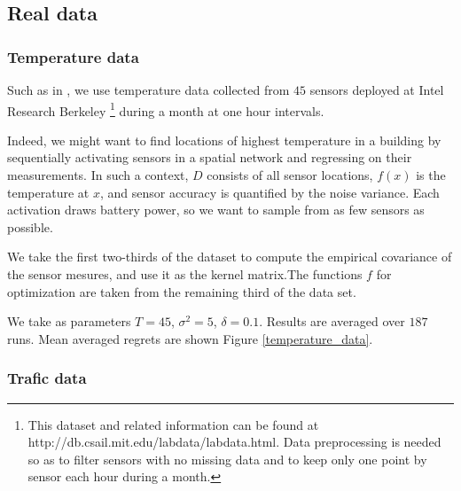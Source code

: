 \documentclass{article} %
\begin{document}
\subsection{Real data} 

\subsubsection{Temperature data}

Such as in \citet{DBLP:conf/icml/SrinivasKKS10}, we use temperature data collected from $45$ sensors deployed at Intel Research Berkeley
\footnote{This dataset and related information can be found at http://db.csail.mit.edu/labdata/labdata.html. Data preprocessing is needed so as to filter sensors with no missing data and to keep only one point by sensor each hour during a month.}
 during a month at one hour intervals.

Indeed, we might want to find locations of highest temperature in a building by sequentially activating sensors in a spatial network and regressing on their measurements. In such a context, $D$ consists of all sensor locations, $f(x)$ is the temperature at $x$, and sensor accuracy is quantified by the noise variance. Each activation draws battery power, so we want to sample from as few sensors as possible.

We take the first two-thirds of the dataset to compute the empirical covariance of the sensor mesures, and use it as the kernel matrix.The functions $f$ for optimization are taken from the remaining third of the data set.

We take as parameters $T=45$, $\sigma^2=5$, $\delta = 0.1$. Results are averaged over $187$ runs. Mean averaged regrets are shown Figure \ref{temperature_data}.


\subsubsection{Trafic data}
\end{document}

